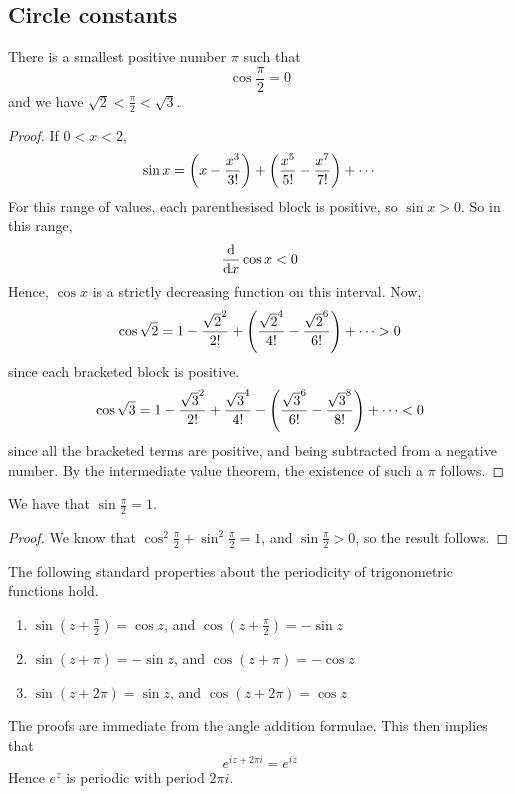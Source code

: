\subsection{Circle constants}
\begin{proposition}
	There is a smallest positive number \(\pi\) such that
	\[
		\cos \frac{\pi}{2} = 0
	\]
	and we have \(\sqrt{2} < \frac{\pi}{2} < \sqrt{3}\).
\end{proposition}
\begin{proof}
	If \(0 < x < 2\),
	\[
		\sin x = \qty(x - \frac{x^3}{3!}) + \qty(\frac{x^5}{5!} - \frac{x^7}{7!}) + \cdots
	\]
	For this range of values, each parenthesised block is positive, so \(\sin x > 0\).
	So in this range,
	\[
		\dv{x} \cos x < 0
	\]
	Hence, \(\cos x\) is a strictly decreasing function on this interval.
	Now,
	\[
		\cos \sqrt{2} = 1 - \frac{\sqrt{2}^2}{2!} + \qty(\frac{\sqrt{2}^4}{4!} - \frac{\sqrt{2}^6}{6!}) + \cdots > 0
	\]
	since each bracketed block is positive.
	\[
		\cos \sqrt{3} = 1 - \frac{\sqrt{3}^2}{2!} + \frac{\sqrt{3}^4}{4!} - \qty(\frac{\sqrt{3}^6}{6!} - \frac{\sqrt{3}^8}{8!}) + \cdots < 0
	\]
	since all the bracketed terms are positive, and being subtracted from a negative number.
	By the intermediate value theorem, the existence of such a \(\pi\) follows.
\end{proof}
\begin{corollary}
	We have that \(\sin \frac{\pi}{2} = 1\).
\end{corollary}
\begin{proof}
	We know that \(\cos^2 \frac{\pi}{2} + \sin^2 \frac{\pi}{2} = 1\), and \(\sin \frac{\pi}{2} > 0\), so the result follows.
\end{proof}
\begin{theorem}
	The following standard properties about the periodicity of trigonometric functions hold.
	\begin{enumerate}
		\item \(\sin(z + \frac{\pi}{2}) = \cos z\), and \(\cos(z + \frac{\pi}{2}) = -\sin z\)
		\item \(\sin(z + \pi) = -\sin z\), and \(\cos(z + \pi) = -\cos z\)
		\item \(\sin(z + 2 \pi) = \sin z\), and \(\cos(z + 2\pi) = \cos z\)
	\end{enumerate}
\end{theorem}
The proofs are immediate from the angle addition formulae.
This then implies that
\[
	e^{iz + 2\pi i} = e^{iz}
\]
Hence \(e^{z}\) is periodic with period \(2 \pi i\).
